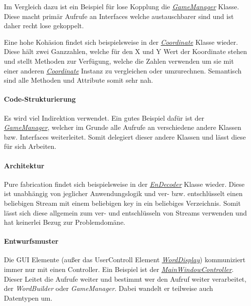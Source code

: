 Im Vergleich dazu ist ein Beispiel für lose Kopplung die \href{https://github.com/EinToni/Wortfinder/blob/main/Wortfinder/GameManager.cs}{\textit{GameManager}} Klasse. Diese macht primär Aufrufe an Interfaces welche austauschbarer sind und ist daher recht lose gekoppelt.

Eine hohe Kohäsion findet sich beispielsweise in der \href{https://github.com/EinToni/Wortfinder/blob/main/Wortfinder/Coordinate.cs}{\textit{Coordinate}} Klasse wieder. Diese hält zwei Ganzzahlen, welche für den X und Y Wert der Koordinate stehen und stellt Methoden zur Verfügung, welche die Zahlen verwenden um sie mit einer anderen \href{https://github.com/EinToni/Wortfinder/blob/main/Wortfinder/Coordinate.cs}{\textit{Coordinate}} Instanz zu vergleichen oder umzurechnen. Semantisch sind alle Methoden und Attribute somit sehr nah.


\paragraph{Code-Strukturierung}
Es wird viel Indirektion verwendet. Ein gutes Beispiel dafür ist der \href{https://github.com/EinToni/Wortfinder/blob/main/Wortfinder/GameManager.cs}{\textit{GameManager}}, welcher im Grunde alle Aufrufe an verschiedene andere Klassen bzw. Interfaces weiterleitet. Somit delegiert dieser andere Klassen und lässt diese für sich Arbeiten.


\paragraph{Architektur}
\glqq Pure fabrication\grqq{} findet sich beispielsweise in der \href{https://github.com/EinToni/Wortfinder/blob/main/Wortfinder/EnDecrypter.cs}{\textit{EnDecoder}} Klasse wieder. Diese ist unabhängig von jeglicher Anwendungslogik und ver- bzw. entschlüsselt einen beliebigen Stream mit einem beliebigen key in ein beliebiges Verzeichnis. Somit lässt sich diese allgemein zum ver- und entschlüsseln von Streams verwenden und hat keinerlei Bezug zur Problemdomäne.


\paragraph{Entwurfsmuster}
Die GUI Elemente (außer das UserControll Element \href{https://github.com/EinToni/Wortfinder/blob/main/Wortfinder/WordDisplay.xaml.cs}{\textit{WordDisplay}}) kommuniziert immer nur mit einen Controller. Ein Beispiel ist der \href{https://github.com/EinToni/Wortfinder/blob/main/Wortfinder/MainWindowController.cs}{\textit{MainWindowController}}. Dieser Leitet die Aufrufe weiter und bestimmt wer den Aufruf weiter verarbeitet, der \textit{WordBuilder} oder \textit{GameManager}. Dabei wandelt er teilweise auch Datentypen um.


